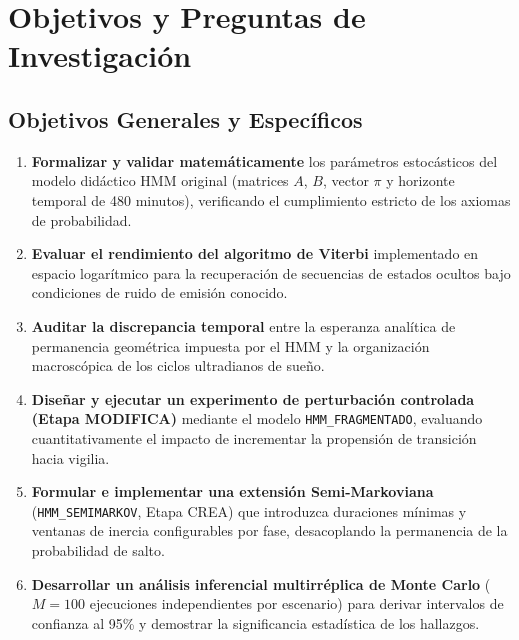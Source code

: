 \documentclass[11pt,a4paper]{article}
\begin{document}
\section{Objetivos y Preguntas de Investigación}

\subsection{Objetivos Generales y Específicos}
\begin{enumerate}[leftmargin=*,itemsep=1pt]
    \item \textbf{Formalizar y validar matemáticamente} los parámetros estocásticos del modelo didáctico HMM original (matrices $A$, $B$, vector $\pi$ y horizonte temporal de 480 minutos), verificando el cumplimiento estricto de los axiomas de probabilidad.
    \item \textbf{Evaluar el rendimiento del algoritmo de Viterbi} implementado en espacio logarítmico para la recuperación de secuencias de estados ocultos bajo condiciones de ruido de emisión conocido.
    \item \textbf{Auditar la discrepancia temporal} entre la esperanza analítica de permanencia geométrica impuesta por el HMM y la organización macroscópica de los ciclos ultradianos de sueño.
    \item \textbf{Diseñar y ejecutar un experimento de perturbación controlada (Etapa MODIFICA)} mediante el modelo \texttt{HMM\_FRAGMENTADO}, evaluando cuantitativamente el impacto de incrementar la propensión de transición hacia vigilia.
    \item \textbf{Formular e implementar una extensión Semi-Markoviana} (\texttt{HMM\_SEMIMARKOV}, Etapa CREA) que introduzca duraciones mínimas y ventanas de inercia configurables por fase, desacoplando la permanencia de la probabilidad de salto.
    \item \textbf{Desarrollar un análisis inferencial multirréplica de Monte Carlo} ($M = 100$ ejecuciones independientes por escenario) para derivar intervalos de confianza al 95\% y demostrar la significancia estadística de los hallazgos.
\end{enumerate}
\end{document}
